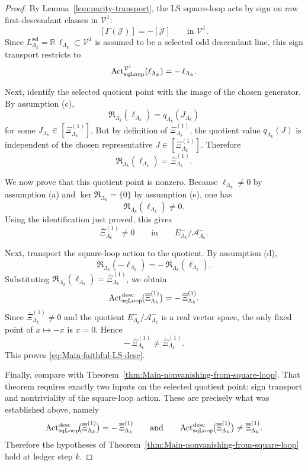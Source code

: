 \begin{proof}
By Lemma~\ref{lem:parity-transport}, the LS square-loop acts by sign on raw
first-descendant classes in \(\mathcal V^1\):
\[
[\Gamma(\mathcal J)] = -[\mathcal J]
\qquad\text{in }\mathcal V^1.
\]
Since \(L^{\mathrm{sel}}_{\Lambda_k}=\mathbb R\,\ell_{\Lambda_k}\subset\mathcal V^1\) is
assumed to be a selected odd descendant line, this sign transport restricts to
\[
\mathrm{Act}^{\mathcal V^1}_{\mathrm{sqLoop}}(\ell_{\Lambda_k})
=
-\,\ell_{\Lambda_k}.
\]

Next, identify the selected quotient point with the image of the chosen generator.
By assumption \textnormal{(c)},
\[
\mathfrak R_{\Lambda_k}(\ell_{\Lambda_k})
=
q_{\Lambda_k}(J_{\Lambda_k})
\]
for some \(J_{\Lambda_k}\in[\Xi^{(1)}_{\Lambda_k}]\).
But by definition of \(\overline{\Xi}^{(1)}_{\Lambda_k}\), the quotient value
\(q_{\Lambda_k}(J)\) is independent of the chosen representative
\(J\in[\Xi^{(1)}_{\Lambda_k}]\). Therefore
\[
\mathfrak R_{\Lambda_k}(\ell_{\Lambda_k})
=
\overline{\Xi}^{(1)}_{\Lambda_k}.
\]

We now prove that this quotient point is nonzero.
Because \(\ell_{\Lambda_k}\neq 0\) by assumption \textnormal{(a)} and
\(\ker\mathfrak R_{\Lambda_k}=\{0\}\) by assumption \textnormal{(e)}, one has
\[
\mathfrak R_{\Lambda_k}(\ell_{\Lambda_k})\neq 0.
\]
Using the identification just proved, this gives
\[
\overline{\Xi}^{(1)}_{\Lambda_k}\neq 0
\qquad\text{in}\qquad
E^-_{\Lambda_k}/\mathcal A^-_{\Lambda_k}.
\]

Next, transport the square-loop action to the quotient.
By assumption \textnormal{(d)},
\[
\mathfrak R_{\Lambda_k}(-\ell_{\Lambda_k})
=
-\,\mathfrak R_{\Lambda_k}(\ell_{\Lambda_k}).
\]
Substituting \(\mathfrak R_{\Lambda_k}(\ell_{\Lambda_k})=\overline{\Xi}^{(1)}_{\Lambda_k}\),
we obtain
\[
\mathrm{Act}^{\mathrm{desc}}_{\mathrm{sqLoop}}\!\big(\overline{\Xi}^{(1)}_{\Lambda_k}\big)
=
-\,\overline{\Xi}^{(1)}_{\Lambda_k}.
\]
Since \(\overline{\Xi}^{(1)}_{\Lambda_k}\neq 0\) and the quotient
\(E^-_{\Lambda_k}/\mathcal A^-_{\Lambda_k}\) is a real vector space, the only fixed
point of \(x\mapsto -x\) is \(x=0\). Hence
\[
-\,\overline{\Xi}^{(1)}_{\Lambda_k}
\neq
\overline{\Xi}^{(1)}_{\Lambda_k}.
\]
This proves \eqref{eq:Main-faithful-LS-desc}.

Finally, compare with Theorem~\ref{thm:Main-nonvanishing-from-square-loop}.
That theorem requires exactly two inputs on the selected quotient point:
sign transport and nontriviality of the square-loop action.
These are precisely what was established above, namely
\[
\mathrm{Act}^{\mathrm{desc}}_{\mathrm{sqLoop}}\!\big(\overline{\Xi}^{(1)}_{\Lambda_k}\big)
=
-\,\overline{\Xi}^{(1)}_{\Lambda_k}
\qquad\text{and}\qquad
\mathrm{Act}^{\mathrm{desc}}_{\mathrm{sqLoop}}\!\big(\overline{\Xi}^{(1)}_{\Lambda_k}\big)
\neq
\overline{\Xi}^{(1)}_{\Lambda_k}.
\]
Therefore the hypotheses of Theorem~\ref{thm:Main-nonvanishing-from-square-loop}
hold at ledger step \(k\).
\end{proof}

